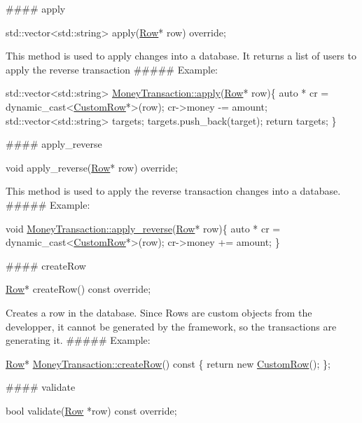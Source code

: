 \#\#\#\# apply 
\begin{DoxyCode}
std::vector<std::string> apply(\mbox{\hyperlink{classRow}{Row}}* row) \textcolor{keyword}{override};
\end{DoxyCode}
 This method is used to apply changes into a database. It returns a list of users to apply the reverse transaction \#\#\#\#\# Example\+: 
\begin{DoxyCode}
std::vector<std::string> \mbox{\hyperlink{classMoneyTransaction_a8aa6f693c524d8e1e052b616546f9647}{MoneyTransaction::apply}}(\mbox{\hyperlink{classRow}{Row}}* row)\{
    \textcolor{keyword}{auto} * cr = \textcolor{keyword}{dynamic\_cast<}\mbox{\hyperlink{classCustomRow}{CustomRow}}*\textcolor{keyword}{>}(row);
    cr->money -= amount;
    std::vector<std::string> targets;
    targets.push\_back(target);
    \textcolor{keywordflow}{return}  targets;
\}
\end{DoxyCode}
 \#\#\#\# apply\+\_\+reverse 
\begin{DoxyCode}
\textcolor{keywordtype}{void} apply\_reverse(\mbox{\hyperlink{classRow}{Row}}* row) \textcolor{keyword}{override};
\end{DoxyCode}
 This method is used to apply the reverse transaction changes into a database. \#\#\#\#\# Example\+: 
\begin{DoxyCode}
\textcolor{keywordtype}{void} \mbox{\hyperlink{classMoneyTransaction_a9eaa71eed1cc8b06ef5773c76c814ad9}{MoneyTransaction::apply\_reverse}}(\mbox{\hyperlink{classRow}{Row}}* row)\{
    \textcolor{keyword}{auto} * cr = \textcolor{keyword}{dynamic\_cast<}\mbox{\hyperlink{classCustomRow}{CustomRow}}*\textcolor{keyword}{>}(row);
    cr->money += amount;
\}
\end{DoxyCode}
 \#\#\#\# create\+Row 
\begin{DoxyCode}
\mbox{\hyperlink{classRow}{Row}}* createRow() \textcolor{keyword}{const override};
\end{DoxyCode}
 Creates a row in the database. Since Rows are custom objects from the developper, it cannot be generated by the framework, so the transactions are generating it. \#\#\#\#\# Example\+: 
\begin{DoxyCode}
\mbox{\hyperlink{classRow}{Row}}* \mbox{\hyperlink{classMoneyTransaction_a53b636ba053baae7705976efce629d21}{MoneyTransaction::createRow}}()\textcolor{keyword}{ const }\{
    \textcolor{keywordflow}{return} \textcolor{keyword}{new} \mbox{\hyperlink{classCustomRow}{CustomRow}}();
\};
\end{DoxyCode}
 \#\#\#\# validate 
\begin{DoxyCode}
\textcolor{keywordtype}{bool} validate(\mbox{\hyperlink{classRow}{Row}} *row) \textcolor{keyword}{const override};
\end{DoxyCode}

